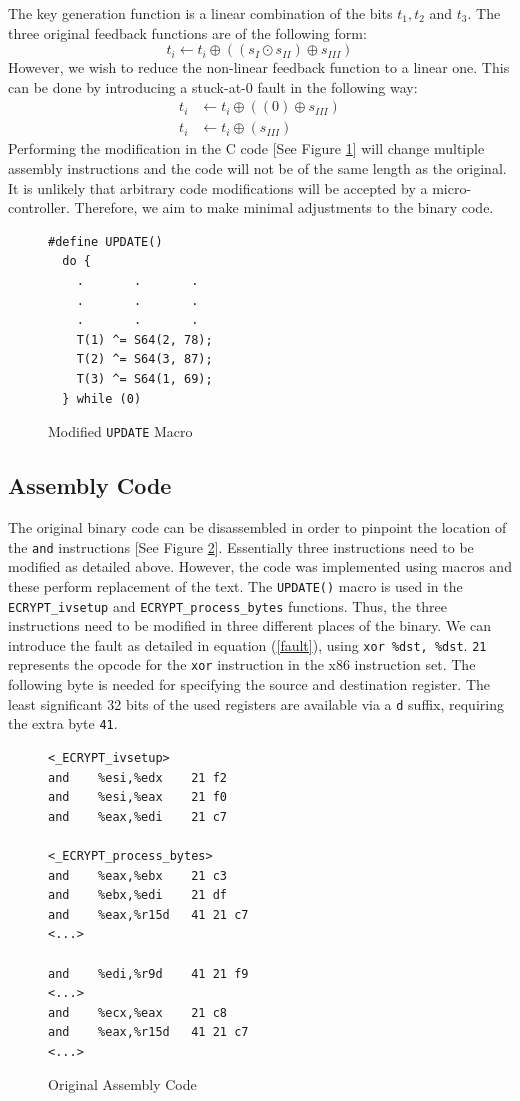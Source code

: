 \documentclass[conference]{IEEEtran}
\newcommand{\code}[1]{\texttt{#1}}
\begin{document}
The key generation function is a linear combination of the bits $t_1, t_2$ and $t_3$.
The three original feedback functions are of the following form: $$t_i \gets t_i \oplus ((s_I \odot s_{II}) \oplus s_{III})$$ However, we wish to reduce the non-linear feedback function to a linear one. This can be done by introducing a stuck-at-0 fault in the following way:
\begin{align}\label{fault}
t_i &\gets t_i \oplus ((0) \oplus s_{III})\\
t_i &\gets t_i \oplus (s_{III})
\end{align}
Performing the modification in the C code [See Figure \ref{modified-macro}] will change multiple assembly instructions and the code will not be of the same length as the original. It is unlikely that arbitrary code modifications will be accepted by a micro-controller. Therefore, we aim to make minimal adjustments to the binary code.
\begin{figure}[H]
\begin{lstlisting}[style=snippet, frame=tlrb]
#define UPDATE()
  do {
    .       .       .
    .       .       .
    .       .       .
    T(1) ^= S64(2, 78); 
    T(2) ^= S64(3, 87); 
    T(3) ^= S64(1, 69); 
  } while (0)
\end{lstlisting}
\caption{Modified \code{UPDATE} Macro}
\label{modified-macro}
\end{figure}

\subsection{Assembly Code}
The original binary code can be disassembled in order to pinpoint the location of the \code{and} instructions [See Figure \ref{fig:orgi-asm}].
Essentially three instructions need to be modified as detailed above. However, the code was implemented using macros and these perform replacement of the text. The \code{UPDATE()} macro is used in the \code{ECRYPT\_ivsetup} and \code{ECRYPT\_process\_bytes} functions. Thus, the three instructions need to be modified in three different places of the binary. 
We can introduce the fault as detailed in equation (\ref{fault}), using \code{xor \%dst, \%dst}. \code{21} represents the opcode for the \code{xor} instruction in the x86 instruction set. The following byte is needed for specifying the source and destination register. The least significant 32 bits of the used registers are available via a \code{d} suffix, requiring the extra byte \code{41}.
\begin{figure}[H]
\begin{lstlisting}[style=asm, frame=tlrb]
<_ECRYPT_ivsetup>
and    %esi,%edx    21 f2
and    %esi,%eax    21 f0
and    %eax,%edi    21 c7

<_ECRYPT_process_bytes>
and    %eax,%ebx    21 c3
and    %ebx,%edi    21 df  
and    %eax,%r15d   41 21 c7
<...>

and    %edi,%r9d    41 21 f9
<...>
and    %ecx,%eax    21 c8
and    %eax,%r15d   41 21 c7
<...>
\end{lstlisting}
\caption{Original Assembly Code}\label{fig:orgi-asm}
\end{figure}
\end{document}

